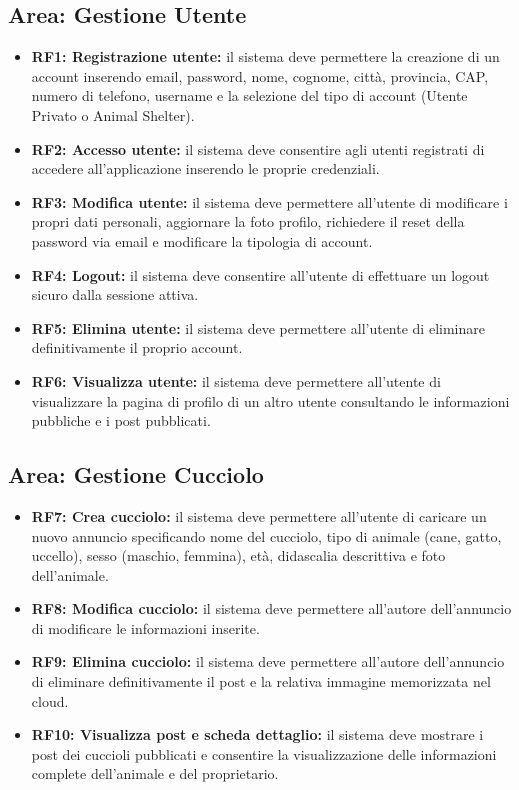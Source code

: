 \documentclass[a4paper]{report}
\begin{document}
\subsection*{Area: Gestione Utente}
\begin{itemize}
    \item \textbf{RF1: Registrazione utente:} il sistema deve permettere la creazione di un account inserendo email, password, nome, cognome, città, provincia, CAP, numero di telefono, username e la selezione del tipo di account (Utente Privato o Animal Shelter).
    \item \textbf{RF2: Accesso utente:} il sistema deve consentire agli utenti registrati di accedere all'applicazione inserendo le proprie credenziali.
    \item \textbf{RF3: Modifica utente:} il sistema deve permettere all'utente di modificare i propri dati personali, aggiornare la foto profilo, richiedere il reset della password via email e modificare la tipologia di account.
    \item \textbf{RF4: Logout:} il sistema deve consentire all'utente di effettuare un logout sicuro dalla sessione attiva.
    \item \textbf{RF5: Elimina utente:} il sistema deve permettere all'utente di eliminare definitivamente il proprio account.
    \item \textbf{RF6: Visualizza utente:} il sistema deve permettere all'utente di visualizzare la pagina di profilo di un altro utente consultando le informazioni pubbliche e i post pubblicati.
\end{itemize}
\subsection*{Area: Gestione Cucciolo}
\begin{itemize}
    \item \textbf{RF7: Crea cucciolo:} il sistema deve permettere all'utente di caricare un nuovo annuncio specificando nome del cucciolo, tipo di animale (cane, gatto, uccello), sesso (maschio, femmina), età, didascalia descrittiva e foto dell'animale.
    \item \textbf{RF8: Modifica cucciolo:} il sistema deve permettere all'autore dell'annuncio di modificare le informazioni inserite.
    \item \textbf{RF9: Elimina cucciolo:} il sistema deve permettere all'autore dell'annuncio di eliminare definitivamente il post e la relativa immagine memorizzata nel cloud.
    \item \textbf{RF10: Visualizza post e scheda dettaglio:} il sistema deve mostrare i post dei cuccioli pubblicati e consentire la visualizzazione delle informazioni complete dell'animale e del proprietario.
\end{itemize}
\end{document}
